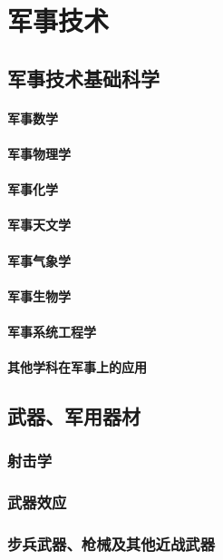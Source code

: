 \documentclass[UTF8]{../ApplicationUniverse}
\begin{document}
\chapter{军事技术}
\section{军事技术基础科学}
        \subsubsection{军事数学}
        \subsubsection{军事物理学}
        \subsubsection{军事化学}
        \subsubsection{军事天文学}
        \subsubsection{军事气象学}
        \subsubsection{军事生物学}
        \subsubsection{军事系统工程学}
        \subsubsection{其他学科在军事上的应用}
\section{武器、军用器材}
    \subsection{射击学}
    \subsection{武器效应}
    \subsection{步兵武器、枪械及其他近战武器}
\end{document}

